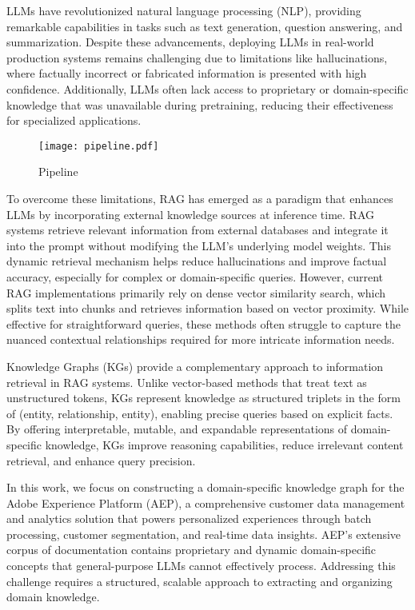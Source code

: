 LLMs have revolutionized natural language processing (NLP), providing remarkable capabilities in tasks such as text generation, question answering, and summarization. Despite these advancements, deploying LLMs in real-world production systems remains challenging due to limitations like hallucinations, where factually incorrect or fabricated information is presented with high confidence. Additionally, LLMs often lack access to proprietary or domain-specific knowledge that was unavailable during pretraining, reducing their effectiveness for specialized applications.  

\begin{figure*}[h]
    \caption{Pipeline}
    \texttt{[image: pipeline.pdf]} 
    \label{fig:flow}
\end{figure*}

To overcome these limitations, RAG has emerged as a paradigm that enhances LLMs by incorporating external knowledge sources at inference time. RAG systems retrieve relevant information from external databases and integrate it into the prompt without modifying the LLM's underlying model weights. This dynamic retrieval mechanism helps reduce hallucinations and improve factual accuracy, especially for complex or domain-specific queries. However, current RAG implementations primarily rely on dense vector similarity search, which splits text into chunks and retrieves information based on vector proximity. While effective for straightforward queries, these methods often struggle to capture the nuanced contextual relationships required for more intricate information needs.  

Knowledge Graphs (KGs) provide a complementary approach to information retrieval in RAG systems. Unlike vector-based methods that treat text as unstructured tokens, KGs represent knowledge as structured triplets in the form of (entity, relationship, entity), enabling precise queries based on explicit facts. By offering interpretable, mutable, and expandable representations of domain-specific knowledge, KGs improve reasoning capabilities, reduce irrelevant content retrieval, and enhance query precision.  



In this work, we focus on constructing a domain-specific knowledge graph for the Adobe Experience Platform (AEP), a comprehensive customer data management and analytics solution that powers personalized experiences through batch processing, customer segmentation, and real-time data insights. AEP's extensive corpus of documentation contains proprietary and dynamic domain-specific concepts that general-purpose LLMs cannot effectively process. Addressing this challenge requires a structured, scalable approach to extracting and organizing domain knowledge.  



